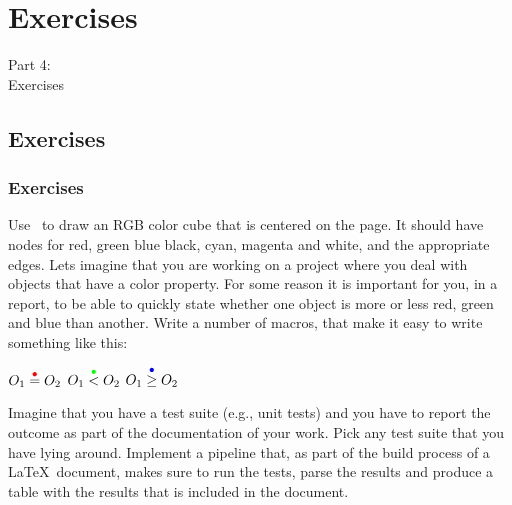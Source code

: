 
{
\renewcommand{\bgcolor}{exercises}

\section{Exercises}
\begin{frame}
  \vspace{25mm}
  \begin{center}
    \Huge{Part 4:\\Exercises}
  \end{center}
\end{frame}

\subsection{Exercises}
\begin{frame}[fragile]
  \frametitle{Exercises}
  \vspace{1mm}
  \begin{enumerate}
     Use \TikZ\ to draw an RGB color cube that is centered on the page. It should have nodes for red, green blue black, cyan, magenta and white, and the appropriate edges.
     Lets imagine that you are working on a project where you deal with objects that have a color property. For some reason it is important for you, in a report, to be able to quickly state whether one object is more or less red, green and blue than another. Write a number of macros, that make it easy to write something like this:
      \begin{center}
        $O_1 \overset{\textcolor{red}{\bullet}}{=} O_2$
        \hspace{2cm}
        $O_1 \overset{\textcolor{green}{\bullet}}{<} O_2$
        \hspace{2cm}
        $O_1 \overset{\textcolor{blue}{\bullet}}{\geq} O_2$
      \end{center}
     Imagine that you have a test suite (e.g., unit tests) and you have to report the outcome as part of the documentation of your work. Pick any test suite that you have lying around. Implement a pipeline that, as part of the build process of a \LaTeX\ document, makes sure to run the tests, parse the results and produce a table with the results that is included in the document.
  \end{enumerate}
\end{frame}

}

